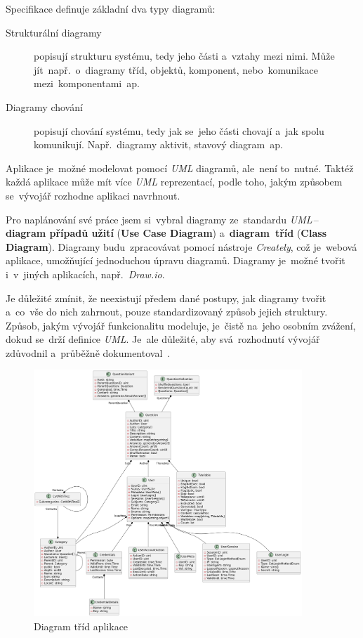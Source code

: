 \documentclass[11pt,a4paper]{report}
\begin{document}
            Specifikace definuje základní dva typy diagramů:
            \begin{description}
                \item[Strukturální diagramy] popisují strukturu systému, tedy jeho části a~vztahy mezi nimi. Může jít~např.~o~diagramy tříd, objektů, komponent, nebo~komunikace mezi~komponentami~ap.
                \item[Diagramy chování] popisují chování systému, tedy jak se~jeho části chovají a~jak spolu komunikují. Např.~diagramy aktivit, stavový diagram~ap.
            \end{description}

            Aplikace je~možné modelovat pomocí \emph{UML} diagramů, ale~není to~nutné. Taktéž každá aplikace může mít více \emph{UML} reprezentací, podle toho, jakým způsobem se~vývojář rozhodne aplikaci navrhnout.

            Pro naplánování své práce jsem si~vybral diagramy ze~standardu \emph{UML}\,--\,\textbf{diagram případů užití} (\textbf{Use Case Diagram}) a~\textbf{diagram~tříd} (\textbf{Class Diagram}). Diagramy budu~zpracovávat pomocí nástroje \emph{Creately}, což je~webová aplikace, umožňující jednoduchou úpravu diagramů. Diagramy je~možné tvořit i~v~jiných aplikacích, např.~\emph{Draw.io}.
            
            Je důležité zmínit, že neexistují předem dané postupy, jak diagramy tvořit a~co~vše do nich zahrnout, pouze standardizovaný způsob jejich struktury. Způsob, jakým vývojář funkcionalitu modeluje, je~čistě na~jeho osobním zvážení, dokud se~drží definice \emph{UML}. Je~ale důležité, aby svá~rozhodnutí vývojář zdůvodnil a~průběžně dokumentoval~\cite{uml:FowlerBook, uml:diagram}.

            \begin{figure}
                \centering
                \includegraphics[width=0.9\textwidth]{files/img/chatuml-diagram.png}
                \caption{Diagram tříd aplikace}
                \label{img:umlclass}
            \end{figure}
\end{document}
